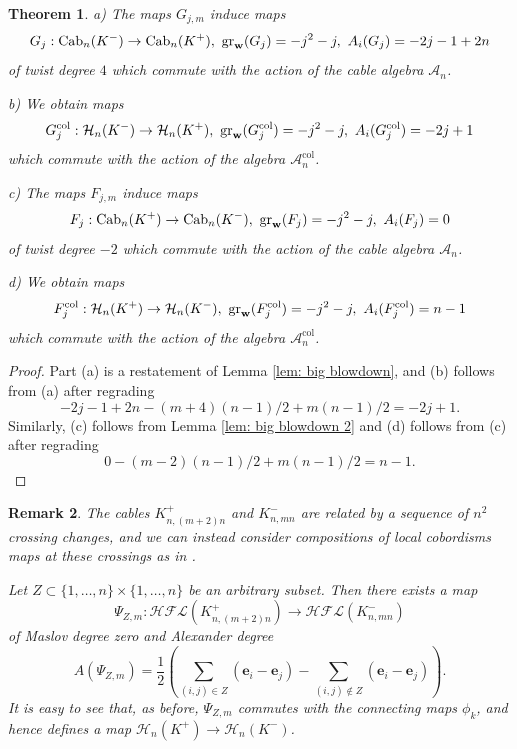 \documentclass{amsart}
\newtheorem{theorem}{Theorem}[section]
\newtheorem{remark}[theorem]{Remark}
\newcommand{\CA}{\mathcal{A}}
\newcommand{\CH}{\mathcal{H}}
\newcommand{\Cab}{\mathrm{Cab}}
\newcommand{\col}{\mathrm{col}}
\newcommand{\cHFL}{\mathcal{H\!F\! L}}
\newcommand{\ee}{\mathbf{e}}
\newcommand{\w}{\mathbf{w}}
\def\gr{\textup{gr}}
\def\w{{\bf{w}}}
\begin{document}
\begin{theorem}
a) The maps $G_{j,m}$ induce maps 
$$
G_j:\Cab_n(K^{-})\to \Cab_n(K^+),\ \gr_{\w}(G_j)=-j^2-j,\ A_i(G_j)=-2j-1+2n
$$ 
of twist degree $4$ which commute with the action of the cable algebra $\CA_n$. 

b) We obtain maps 
$$
G_j^{\col}:\CH_n(K^{-})\to \CH_n(K^+),\ \gr_{\w}(G_j^{\col})=-j^2-j,\ A_i(G_j^{\col})=-2j+1
$$
which commute with the action of the algebra $\CA_n^{\col}$.

c) The maps $F_{j,m}$ induce maps 
$$
F_j:\Cab_n(K^{+})\to \Cab_n(K^-),\ \gr_{\w}(F_j)=-j^2-j,\ A_i(F_j)=0
$$ 
of twist degree $-2$ which commute with the action of the cable algebra $\CA_n$. 

d) We obtain maps 
$$
F_j^{\col}:\CH_n(K^{+})\to \CH_n(K^-),\ \gr_{\w}(F_j^{\col})=-j^2-j,\ A_i(F_j^{\col})=n-1
$$
which commute with the action of the algebra $\CA_n^{\col}$.
\end{theorem}



\begin{proof}
Part (a) is a restatement of Lemma \ref{lem: big blowdown}, and  (b) follows from (a) after regrading
$$
-2j-1+2n-(m+4)(n-1)/2+m(n-1)/2=-2j+1.
$$
Similarly, (c) follows from Lemma \ref{lem: big blowdown 2} and (d) follows from (c) after regrading
$$
0-(m-2)(n-1)/2+m(n-1)/2=n-1.
$$
\end{proof}

\begin{remark}
The cables $K^+_{n,(m+2)n}$ and $K^-_{n,mn}$ are related by a sequence of $n^2$ crossing changes, and we can instead consider compositions of local cobordisms maps at these crossings as in \cite[Section 5]{AGL}.

Let $Z\subset \{1,\ldots,n\}\times \{1,\ldots,n\}$ be an arbitrary subset. Then there exists a   map 
$$
\Psi_{Z,m}:\cHFL\left(K^+_{n,(m+2)n}\right)\to \cHFL\left(K^-_{n,mn}\right)
$$
of Maslov degree zero and Alexander degree 
$$
A(\Psi_{Z,m})=\frac{1}{2}\left(\sum_{(i,j)\in Z}(\ee_i-\ee_j)-\sum_{(i,j)\notin Z}(\ee_i-\ee_j)\right).
$$
It is easy to see that, as before, $\Psi_{Z,m}$ commutes with the connecting maps $\phi_k$, and hence defines a map $\CH_n(K^+)\to \CH_n(K^-)$.
\end{remark}

 


 
\end{document}
